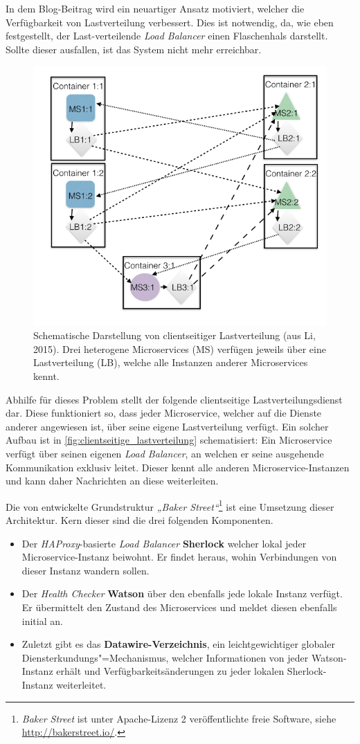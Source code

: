 In dem Blog-Beitrag \cite{Li15} wird ein neuartiger Ansatz motiviert, welcher die Verfügbarkeit von Lastverteilung verbessert. Dies ist notwendig, da, wie eben festgestellt, der Last-verteilende \textit{Load Balancer} einen Flaschenhals darstellt. Sollte dieser ausfallen, ist das System nicht mehr erreichbar.

\begin{figure}[h]
	\centering
	\includegraphics[width=.55\linewidth]{img/clientloadbal}
	\caption{Schematische Darstellung von clientseitiger Lastverteilung (aus Li, 2015). Drei heterogene Microservices (MS) verfügen jeweils über eine Lastverteilung (LB), welche alle Instanzen anderer Microservices kennt.}
	\label{fig:clientseitige_lastverteilung}
\end{figure}

Abhilfe für dieses Problem stellt der folgende clientseitige Lastverteilungsdienst dar. Diese funktioniert so, dass jeder Microservice, welcher auf die Dienste anderer angewiesen ist, über seine eigene Lastverteilung verfügt. Ein solcher Aufbau ist in \autoref{fig:clientseitige_lastverteilung} schematisiert: Ein Microservice verfügt über seinen eigenen \textit{Load Balancer}, an welchen er seine ausgehende Kommunikation exklusiv leitet. Dieser kennt alle anderen Microservice-Instanzen und kann daher Nachrichten an diese weiterleiten.

Die von \citeauthor{Li15} entwickelte Grundstruktur \textit{„Baker Street“}\footnote{\textit{Baker Street} ist unter Apache-Lizenz 2 veröffentlichte freie Software, siehe \url{http://bakerstreet.io/}.} ist eine Umsetzung dieser Architektur. Kern dieser sind die drei folgenden Komponenten.

\begin{itemize}
	\item Der \textit{HAProxy}-basierte \textit{Load Balancer} \textbf{Sherlock} welcher lokal jeder Microservice-Instanz beiwohnt. Er findet heraus, wohin Verbindungen von dieser Instanz wandern sollen.
	
	\item Der \textit{Health Checker} \textbf{Watson} über den ebenfalls jede lokale Instanz verfügt. Er übermittelt den Zustand des Microservices und meldet diesen ebenfalls initial an.
	
	\item Zuletzt gibt es das \textbf{Datawire-Verzeichnis}, ein leichtgewichtiger globaler Diensterkundungs"=Mechanismus, welcher Informationen von jeder Watson-Instanz erhält und Verfügbarkeitsänderungen zu jeder lokalen Sherlock-Instanz weiterleitet.
\end{itemize}

